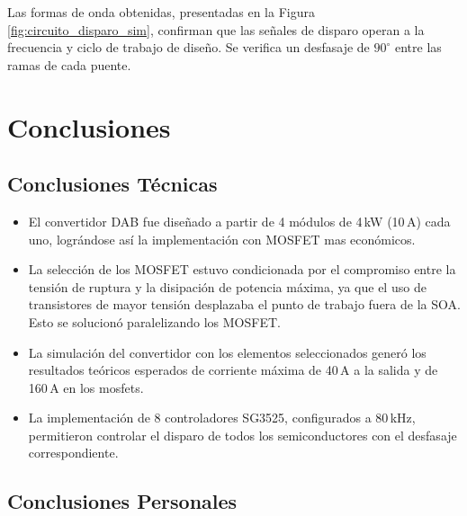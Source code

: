 \documentclass[11pt, a4paper]{article}
\begin{document}
Las formas de onda obtenidas, presentadas en la Figura \ref{fig:circuito_disparo_sim}, confirman que las señales de disparo operan a la frecuencia y ciclo de trabajo de diseño. Se verifica un desfasaje de $90^\circ$ entre las ramas de cada puente.

\section{Conclusiones}

\subsection{Conclusiones Técnicas}

\begin{itemize}
    \item El convertidor DAB fue diseñado a partir de 4 módulos de 4\,kW (10\,A) cada uno, lográndose así la implementación con MOSFET mas económicos.
    \item La selección de los MOSFET estuvo condicionada por el compromiso entre la tensión de ruptura y la disipación de potencia máxima, ya que el uso de transistores de mayor tensión desplazaba el punto de trabajo fuera de la SOA. Esto se solucionó paralelizando los MOSFET.
    \item La simulación del convertidor con los elementos seleccionados generó los resultados teóricos esperados de corriente máxima de 40\,A a la salida y de 160\,A en los mosfets.
    \item La implementación de 8 controladores SG3525, configurados a 80\,kHz, permitieron controlar el disparo de todos los semiconductores con el desfasaje correspondiente.
\end{itemize}

\subsection{Conclusiones Personales}




\nocite{*}
\printbibliography[title={Bibliografía}]
\end{document}
